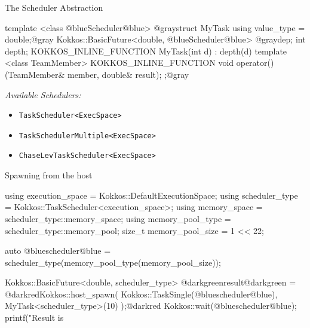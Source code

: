 
\begin{frame}[fragile]{The Scheduler Abstraction}
  \begin{code}[keywords={}]
template <class @blueScheduler@blue>
@graystruct MyTask {
  using value_type = double;@gray
  Kokkos::BasicFuture<double, @blueScheduler@blue> @graydep;
  int depth;
  KOKKOS_INLINE_FUNCTION MyTask(int d) : depth(d) { } 
  template <class TeamMember>
  KOKKOS_INLINE_FUNCTION
  void operator()(TeamMember& member, double& result);
};@gray
  \end{code}

    \vspace{1em}

  {\em{Available Schedulers:}}
  \begin{itemize}
    \item \texttt{TaskScheduler<ExecSpace>}
    \item \texttt{TaskSchedulerMultiple<ExecSpace>}
    \item \texttt{ChaseLevTaskScheduler<ExecSpace>}
  \end{itemize}
\end{frame}


\begin{frame}[fragile]{Spawning from the host}
  \begin{code}[keywords={}]
using execution_space = Kokkos::DefaultExecutionSpace;
using scheduler_type = Kokkos::TaskScheduler<execution_space>;
using memory_space = scheduler_type::memory_space;
using memory_pool_type = scheduler_type::memory_pool;
size_t memory_pool_size = 1 << 22;

auto @bluescheduler@blue = 
  scheduler_type(memory_pool_type(memory_pool_size));

Kokkos::BasicFuture<double, scheduler_type> @darkgreenresult@darkgreen =
  @darkredKokkos::host_spawn(
    Kokkos::TaskSingle(@bluescheduler@blue),
    MyTask<scheduler_type>(10)
  );@darkred
Kokkos::wait(@bluescheduler@blue);
printf("Result is %
  \end{code}
\end{frame}


